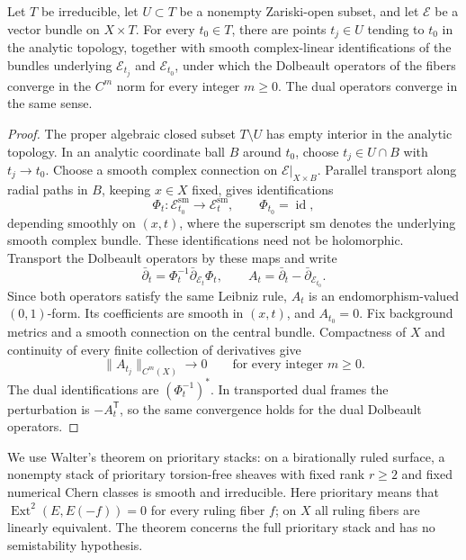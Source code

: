 \begin{lemma}\label{lem:dense-family-smooth-dolbeault-convergence}
Let $T$ be irreducible, let $U\subset T$ be a nonempty Zariski-open subset, and let $\mathcal E$ be a vector bundle on $X\times T$. For every $t_0\in T$, there are points $t_j\in U$ tending to $t_0$ in the analytic topology, together with smooth complex-linear identifications of the bundles underlying $\mathcal E_{t_j}$ and $\mathcal E_{t_0}$, under which the Dolbeault operators of the fibers converge in the $C^m$ norm for every integer $m\geq0$. The dual operators converge in the same sense.
\end{lemma}
\begin{proof}
The proper algebraic closed subset $T\setminus U$ has empty interior in the analytic topology. In an analytic coordinate ball $B$ around $t_0$, choose $t_j\in U\cap B$ with $t_j\to t_0$. Choose a smooth complex connection on $\mathcal E|_{X\times B}$. Parallel transport along radial paths in $B$, keeping $x\in X$ fixed, gives identifications
\[
 \Phi_t\colon\mathcal E_{t_0}^{\mathrm{sm}}\longrightarrow
          \mathcal E_t^{\mathrm{sm}},\qquad \Phi_{t_0}=\operatorname{id},
\]
depending smoothly on $(x,t)$, where the superscript $\mathrm{sm}$ denotes the underlying smooth complex bundle. These identifications need not be holomorphic. Transport the Dolbeault operators by these maps and write
\[
 \bar\partial_t=\Phi_t^{-1}\bar\partial_{\mathcal E_t}\Phi_t,
 \qquad A_t=\bar\partial_t-\bar\partial_{\mathcal E_{t_0}}.
\]
Since both operators satisfy the same Leibniz rule, $A_t$ is an endomorphism-valued $(0,1)$-form. Its coefficients are smooth in $(x,t)$, and $A_{t_0}=0$. Fix background metrics and a smooth connection on the central bundle. Compactness of $X$ and continuity of every finite collection of derivatives give
\[
 \|A_{t_j}\|_{C^m(X)}\longrightarrow0
 \qquad\text{for every integer }m\geq0.
\]
The dual identifications are $(\Phi_t^{-1})^*$. In transported dual frames the perturbation is $-A_t^{\mathsf T}$, so the same convergence holds for the dual Dolbeault operators.
\end{proof}

We use Walter's theorem on prioritary stacks: on a birationally ruled surface, a nonempty stack of prioritary torsion-free sheaves with fixed rank $r\geq2$ and fixed numerical Chern classes is smooth and irreducible. Here prioritary means that $\operatorname{Ext}^2(E,E(-f))=0$ for every ruling fiber $f$; on $X$ all ruling fibers are linearly equivalent. The theorem concerns the full prioritary stack and has no semistability hypothesis.

